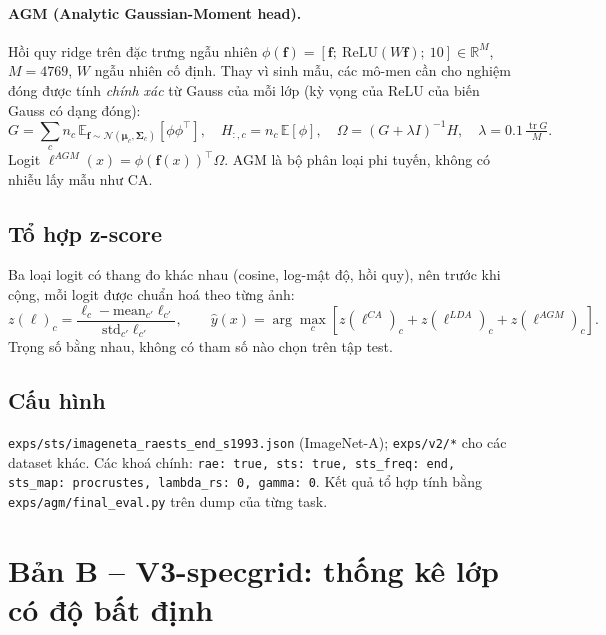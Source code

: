 \documentclass[11pt]{article}
\newcommand{\R}{\mathbb{R}}
\newcommand{\bmu}{\boldsymbol{\mu}}
\newcommand{\bSigma}{\boldsymbol{\Sigma}}
\newcommand{\vf}{\mathbf{f}}
\newcommand{\tr}{\operatorname{tr}}
\begin{document}
\paragraph{AGM (Analytic Gaussian-Moment head).} Hồi quy ridge trên đặc trưng ngẫu nhiên \cite{rahimi}
$\phi(\vf)=[\vf;\ \mathrm{ReLU}(W\vf);\ 10]\in\R^{M}$, $M=4769$, $W$ ngẫu nhiên cố định. Thay vì sinh mẫu, các mô-men cần
cho nghiệm đóng được tính \emph{chính xác} từ Gauss của mỗi lớp (kỳ vọng của ReLU của biến Gauss có dạng đóng):
\begin{equation}
G=\sum_c n_c\,\mathbb{E}_{\vf\sim\mathcal{N}(\bmu_c,\bSigma_c)}\!\left[\phi\phi^\top\right],\quad
H_{:,c}=n_c\,\mathbb{E}[\phi],\quad
\Omega=(G+\lambda I)^{-1}H,\quad \lambda=0.1\,\tfrac{\tr G}{M}.
\end{equation}
Logit $\ell^{AGM}(x)=\phi(\vf(x))^\top\Omega$. AGM là bộ phân loại phi tuyến, không có nhiễu lấy mẫu như CA.

\subsection{Tổ hợp z-score}
Ba loại logit có thang đo khác nhau (cosine, log-mật độ, hồi quy), nên trước khi cộng, mỗi logit được chuẩn hoá theo
từng ảnh:
\begin{equation}
z(\ell)_c=\frac{\ell_c-\mathrm{mean}_{c'}\ell_{c'}}{\mathrm{std}_{c'}\ell_{c'}},\qquad
\hat y(x)=\arg\max_c\left[z(\ell^{CA})_c+z(\ell^{LDA})_c+z(\ell^{AGM})_c\right].
\end{equation}
Trọng số bằng nhau, không có tham số nào chọn trên tập test.

\subsection{Cấu hình}
\texttt{exps/sts/imageneta\_raests\_end\_s1993.json} (ImageNet-A); \texttt{exps/v2/*} cho các dataset khác. Các khoá
chính: \texttt{rae: true, sts: true, sts\_freq: end, sts\_map: procrustes, lambda\_rs: 0, gamma: 0}. Kết quả tổ hợp tính
bằng \texttt{exps/agm/final\_eval.py} trên dump của từng task.

\section{Bản B -- V3-specgrid: thống kê lớp có độ bất định}\label{sec:v3}
\end{document}

